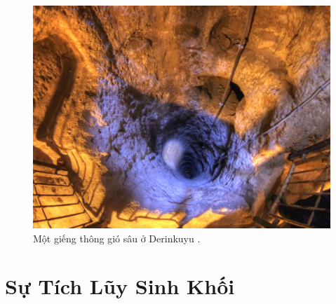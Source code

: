 \documentclass[10pt,twocolumn,letterpaper]{article}
\begin{document}
\begin{figure}[t]
\begin{center}
   \includegraphics[width=1\linewidth]{derinkuyu-air.jpg}
\end{center}
   \caption{Một giếng thông gió sâu ở Derinkuyu \cite{53}.}
\label{fig:6}
\label{fig:onecol}
\end{figure}


\section{Sự Tích Lũy Sinh Khối}
\end{document}
